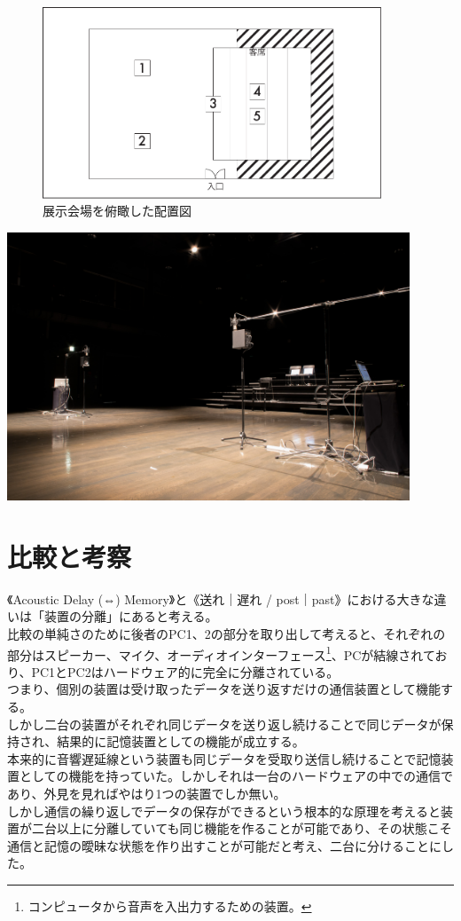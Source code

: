 \documentclass[a4paper,report]{jsbook}
\begin{document}
\begin{figure}[htbp]
\centering
\includegraphics[width=0.90000\textwidth]{./img/place.pdf}
\caption{展示会場を俯瞰した配置図\label{fig:fukan}}
\end{figure}

\includegraphics[width=0.90000\textwidth]{./img/postpast1.jpg}~

\section{比較と考察}\label{ux6bd4ux8f03ux3068ux8003ux5bdf}

《Acoustic Delay (⇔) Memory》と《送れ｜遅れ /
post｜past》における大きな違いは「装置の分離」にあると考える。\\
比較の単純さのために後者のPC1、2の部分を取り出して考えると、それぞれの部分はスピーカー、マイク、オーディオインターフェース\footnote{コンピュータから音声を入出力するための装置。}、PCが結線されており、PC1とPC2はハードウェア的に完全に分離されている。\\
つまり、個別の装置は受け取ったデータを送り返すだけの通信装置として機能する。\\
しかし二台の装置がそれぞれ同じデータを送り返し続けることで同じデータが保持され、結果的に記憶装置としての機能が成立する。\\
本来的に音響遅延線という装置も同じデータを受取り送信し続けることで記憶装置としての機能を持っていた。しかしそれは一台のハードウェアの中での通信であり、外見を見ればやはり1つの装置でしか無い。\\
しかし通信の繰り返しでデータの保存ができるという根本的な原理を考えると装置が二台以上に分離していても同じ機能を作ることが可能であり、その状態こそ通信と記憶の曖昧な状態を作り出すことが可能だと考え、二台に分けることにした。
\end{document}
